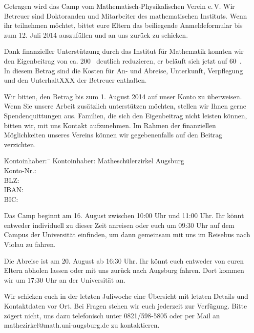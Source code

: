\documentclass{zettel}
\begin{document}
Getragen wird das Camp vom Mathematisch-Physikalischen Verein e.\,V. Wir
Betreuer sind Doktoranden und Mitarbeiter des mathematischen Instituts.
Wenn ihr teilnehmen möchtet, bittet eure Eltern das beiliegende Anmeldeformular
bis zum 12. Juli 2014 auszufüllen und an uns zurück zu schicken.
\vspace{\medskipamount}

\begin{minipage}{0.54\textwidth}
Dank finanzieller Unterstützung durch das Institut für Mathematik konnten wir
den Eigenbeitrag von ca. 200~\texteuro{} deutlich reduzieren, er beläuft sich
jetzt auf 60~\texteuro. In diesem Betrag sind die Kosten für An- und Abreise,
Unterkunft, Verpflegung und den UnterhaltXXX der Betreuer enthalten.
\end{minipage}

\newpage

Wir bitten, den Betrag bis zum 1. August 2014 auf
unser Konto zu überweisen. Wenn Sie unsere Arbeit zusätzlich unterstützen
möchten, stellen wir Ihnen gerne Spendenquittungen aus. Familien, die sich den
Eigenbeitrag nicht leisten können, bitten wir, mit uns Kontakt aufzunehmen. Im
Rahmen der finanziellen Möglichkeiten unseres Vereins können wir gegebenenfalls
auf den Beitrag verzichten.

\vspace{-0.7em}
\begin{tabbing}
  \qquad\qquad \= Kontoinhaber:\, \= \kill
  \> Kontoinhaber: \> Matheschülerzirkel Augsburg \\
  \> Konto-Nr.:  \\
  \> BLZ:  \\
  \> IBAN:  \\
  \> BIC: 
\end{tabbing}
\vspace{-0.7em}

Das Camp beginnt am 16. August zwischen 10:00 Uhr und 11:00 Uhr. Ihr könnt
entweder individuell zu dieser Zeit anreisen oder euch um 09:30 Uhr auf dem Campus der
Universität einfinden, um dann gemeinsam mit uns im Reisebus nach Violau zu fahren.

Die Abreise ist am 20. August ab 16:30 Uhr. Ihr könnt euch entweder von euren
Eltern abholen lassen oder mit uns zurück nach Augsburg fahren. Dort kommen wir
um 17:30 Uhr an der Universität an.

Wir schicken euch in der letzten Juliwoche eine Übersicht mit
letzten Details und Kontaktdaten vor Ort. Bei Fragen stehen wir euch jederzeit
zur Verfügung. Bitte zögert nicht, uns dazu telefonisch unter 0821/598-5805 oder per
Mail an \textsf{mathezirkel@math.uni-augsburg.de} zu kontaktieren.
\end{document}

